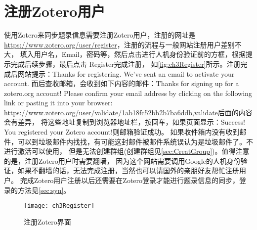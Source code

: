 \documentclass[cn,11pt,chinese]{elegantbook}
\begin{document}
			\section{注册Zotero用户}\label{sec:zotReg}
		使用Zotero来同步题录信息需要注册Zotero用户，注册的网址是\url{https://www.zotero.org/user/register}，注册的流程与一般网站注册用户差别不大，
		填入用户名，Email，密码等，然后点击进行人机身份验证前的方框，根据提示完成后续步骤，最后点击 Register完成注册，
		如\autoref{fig:ch3Register}所示。注册完成后网站提示：Thanks for registering. We’ve sent an email to activate your account.
		而后查收邮箱，会收到如下内容的邮件：Thanks for signing up for a zotero.org account! Please confirm your email address 
		by clicking on the following link or pasting it into your browser: 
		\url{https://www.zotero.org/user/validate/1ab18fc52bb2b7ba6ddb},validate后面的内容会有差异，
		将这些地址复制到浏览器地址栏，按回车，如果页面显示：Success! You registered your Zotero account!则邮箱验证成功。
		如果收件箱内没有收到邮件，可以到垃圾邮件内找找，有可能这封邮件被邮件系统误认为是垃圾邮件了。不进行激活可以使用，
		但是无法创建群组(创建群组见\cref{sec:CreatGroup})。值得注意的是，注册Zotero用户时需要翻墙，
		因为这个网站需要调用Google的人机身份验证，如果不翻墙的话，无法完成注册，当然也可以请国外的亲朋好友帮忙注册用户。
		完成Zotero用户注册以后还需要在Zotero登录才能进行题录信息的同步，登录的方法见\cref{sec:syn}。
		\begin{figure}[htbp]
			\centering
			\texttt{[image: ch3Register]}
			\caption{注册Zotero界面}
			\label{fig:ch3Register}
		\end{figure}
		
\end{document}
